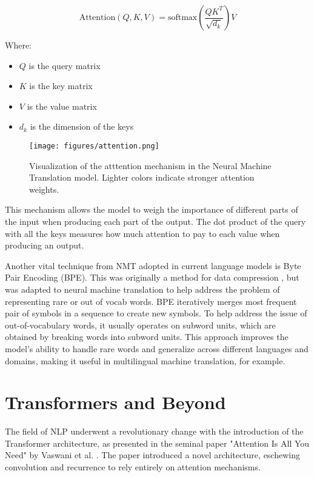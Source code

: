 \documentclass[a4paper, oneside]{discothesis}
\begin{document}
\begin{equation}
\text{Attention}(Q, K, V) = \text{softmax}\left(\frac{QK^T}{\sqrt{d_k}}\right)V
\end{equation}

Where:
\begin{itemize}
    \item $Q$ is the query matrix
    \item $K$ is the key matrix
    \item $V$ is the value matrix
    \item $d_k$ is the dimension of the keys
\end{itemize}

\begin{figure}[h]
    \centering
    \texttt{[image: figures/attention.png]}
    \caption{Visualization of the atttention mechanism in the Neural Machine Translation model. Lighter colors indicate stronger attention weights.}
    \label{fig:nmt_self_attention}
\end{figure}

This mechanism allows the model to weigh the importance of different parts of the input when producing each part of the output. The dot product of the query with all the keys measures how much attention to pay to each value when producing an output.

Another vital technique from NMT adopted in current language models is Byte Pair Encoding (BPE). This was originally a method for data compression \cite{PhilipGage1994}, but was adapted to neural machine translation to help address the problem of representing rare or out of vocab words\cite{sennrich2015neural}. BPE iteratively merges most frequent pair of symbols in a sequence to create new symbols. To help address the issue of out-of-vocabulary words, it usually operates on subword units, which are obtained by breaking words into subword units. This approach improves the model's ability to handle rare words and generalize across different languages and domains, making it useful in multilingual machine translation, for example.

\section{Transformers and Beyond}
The field of NLP underwent a revolutionary change with the introduction of the Transformer architecture, as presented in the seminal paper "Attention Is All You Need" by Vaswani et al. \cite{vaswani2017attention}. The paper introduced a novel architecture, eschewing convolution and recurrence to rely entirely on attention mechanisms.
\end{document}
